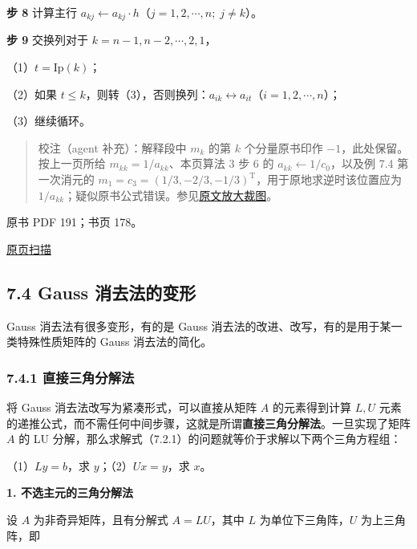 \documentclass[
  10pt,
  fontset=fandol]{ctexart}
\begin{document}
\textbf{步 8} 计算主行 \(a_{kj}\leftarrow a_{kj}\cdot h\)（\(j=1,2,\cdots,n;\;j\ne k\)）。

\textbf{步 9} 交换列对于 \(k=n-1,n-2,\cdots,2,1\)，

（1）\(t=\mathrm{Ip}(k)\)；

（2）如果 \(t\le k\)，则转（3），否则换列：\(a_{ik}\leftrightarrow a_{it}\)（\(i=1,2,\cdots,n\)）；

（3）继续循环。

\begin{quote}
校注（agent 补充）：解释段中 \(m_k\) 的第 \(k\) 个分量原书印作 \(-1\)，此处保留。按上一页所给 \(m_{kk}=1/a_{kk}\)、本页算法 3 步 6 的 \(a_{kk}\leftarrow1/c_0\)，以及例 7.4 第一次消元的 \(m_1=c_3=(1/3,-2/3,-1/3)^{\mathrm T}\)，用于原地求逆时该位置应为 \(1/a_{kk}\)；疑似原书公式错误。参见\href{/Users/xiangjunfeng/Desktop/数值计算专用/numerical-analysis/book/staging/ch07a/assets/pdf-190-multiplier-detail.png}{原文放大裁图}。
\end{quote}

\clearpage

原书 PDF 191；书页 178。

\href{/Users/xiangjunfeng/Desktop/数值计算专用/numerical-analysis/book/source-images/pdf-191.jpeg}{原页扫描}

\subsection{7.4 Gauss 消去法的变形}\label{gauss-ux6d88ux53bbux6cd5ux7684ux53d8ux5f62}

Gauss 消去法有很多变形，有的是 Gauss 消去法的改进、改写，有的是用于某一类特殊性质矩阵的 Gauss 消去法的简化。

\subsubsection{7.4.1 直接三角分解法}\label{ux76f4ux63a5ux4e09ux89d2ux5206ux89e3ux6cd5}

将 Gauss 消去法改写为紧凑形式，可以直接从矩阵 \(A\) 的元素得到计算 \(L,U\) 元素的递推公式，而不需任何中间步骤，这就是所谓\textbf{直接三角分解法}。一旦实现了矩阵 \(A\) 的 LU 分解，那么求解式（7.2.1）的问题就等价于求解以下两个三角方程组：

（1）\(Ly=b\)，求 \(y\)；（2）\(Ux=y\)，求 \(x\)。

\textbf{1. 不选主元的三角分解法}

设 \(A\) 为非奇异矩阵，且有分解式 \(A=LU\)，其中 \(L\) 为单位下三角阵，\(U\) 为上三角阵，即
\end{document}
